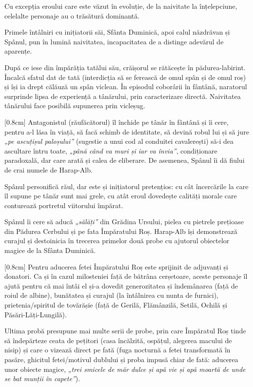 Cu excepția eroului care este văzut în evoluție, de la naivitate la înțelepciune, celelalte personaje au o trăsătură dominantă.

Primele întâlniri cu inițiatorii săi, Sfânta Duminică, apoi calul năzdrăvan și Spânul, pun în lumină naivitatea, incapacitatea de a distinge adevărul de aparențe.

După ce iese din împărăția tatălui său, crăișorul se rătăcește în pădurea-labirint. Încalcă sfatul dat de tată (interdicția să se ferească de omul spân și de omul roș) și își ia drept călăuză un spân viclean. În episodul coborârii în fântână, naratorul surprinde lipsa de experiență a tânărului, prin caracterizare directă. Naivitatea tânărului face posibilă supunerea prin vicleșug.

[0.8cm]
Antagonistul (răufăcătorul) îl închide pe tânăr în fântână și îi cere, pentru a-l lăsa în viață, să facă schimb de identitate, să devină robul lui și să jure \textit{„pe ascuțișul paloșului”} (sugestie a unui cod al conduitei cavalerești) să-i dea ascultare întru toate, \textit{„până când va muri și iar va învia”}, condiționare paradoxală, dar care arată și calea de eliberare. De asemenea, Spânul îi dă fiului de crai numele de Harap-Alb.

Spânul personifică răul, dar este și inițiatorul pretențios: cu cât încercările la care îl supune pe tânăr sunt mai grele, cu atât eroul dovedește calități morale care conturează portretul viitorului împărat.

Spânul îi cere să aducă \textit{„sălăți”} din Grădina Ursului, pielea cu pietrele prețioase din Pădurea Cerbului și pe fata Împăratului Roș. Harap-Alb își demonstrează curajul și destoinicia în trecerea primelor două probe cu ajutorul obiectelor magice de la Sfânta Duminică.

[0.8cm]
Pentru aducerea fetei Împăratului Roș este sprijinit de adjuvanți și donatori. Ca și în cazul milosteniei față de bătrâna cerșetoare, aceste personaje îl ajută pentru că mai întâi el și-a dovedit generozitatea și îndemânarea (față de roiul de albine), bunătatea și curajul (la întâlnirea cu nunta de furnici), prietenia/spiritul de tovărășie (față de Gerilă, Flămânzilă, Setilă, Ochilă și Păsări-Lăți-Lungilă).

Ultima probă presupune mai multe serii de probe, prin care Împăratul Roș tinde să îndepărteze ceata de pețitori (casa încălzită, ospățul, alegerea macului de nisip) și care o vizează direct pe fată (fuga nocturnă a fetei transformată în pasăre, ghicitul fetei/motivul dublului și proba impusă chiar de fată: aducerea unor obiecte magice, \textit{„trei smicele de măr dulce și apă vie și apă moartă de unde se bat munții în capete”}).

